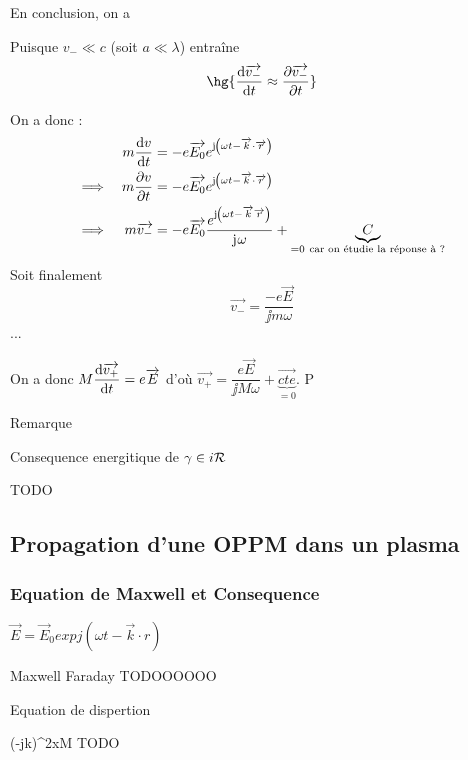 \documentclass[a4paper,french,bookmarks]{book}
\begin{document}
    En conclusion, on a 
    \begin{property}{}{}
        Puisque $v_- \ll c$ (soit $a \ll \lambda$) entraîne
        \[ \hg{\dfrac{\dif \vec{v_-}}{\dif t} \approx \dfrac{\partial \vec{v_-}}{\partial t}} \]
    \end{property}
    
    On a donc :
    \begin{align*}
        && m\dfrac{\mathrm d v}{\mathrm d t} &= -e\overrightarrow{E_0} e^{\mathrm{j\mkern1mu} \!\left(\omega t - \overrightarrow{k} \cdot \overrightarrow{r}\right)}\\
        \implies && m\dfrac{\partial v}{\partial t} &= -e\overrightarrow{E_0} e^{\mathrm{j\mkern1mu} \!\left(\omega t - \overrightarrow{k} \cdot \overrightarrow{r}\right)}\\
        \implies && m\overrightarrow{v_-} &= -e\overrightarrow{E_0}\dfrac{e^{\mathrm{j\mkern1mu}\!\left(\omega t - \overrightarrow{k}\overrightarrow{r}\right)}}{\mathrm{j\mkern1mu} \omega} + \underbrace{C}_{= 0 \ \text{car on étudie la réponse à ?}}
    \end{align*}
    Soit finalement
    \[ \vec{v_-} = \dfrac{-e\vec E}{\jj m \omega}\]
    ...
    
    On a donc $M \dfrac{\mathrm d \overrightarrow{v_+}}{\mathrm d t} = e\overrightarrow{E}$ d'où $\vec{v_+} = \dfrac{e\vec E}{\jj M \omega} + \underbrace{\vec{cte}}_{= 0}$. P
    
    \begin{form}{Remarque}{}
        \begin{enumerate}
            
            \itast Consequence energitique de $\gamma \in i \mathcal{R}$
            
            \itast TODO
            
            
        \end{enumerate}
    \end{form}
    
    \subsection{Propagation d'une OPPM  dans un plasma }
        \subsubsection{Equation de Maxwell et Consequence}
        
        
        $\vec E = \vec E_0 exp{j(\omega t - \vec k \cdot r)}$
        
        \itast Maxwell Faraday TODOOOOOO
        
        \begin{form}{}{}
            Equation de dispertion 
            
            (-j\vec k)^2xM TODO
            
        \end{form}
    
    
    
\end{document}
